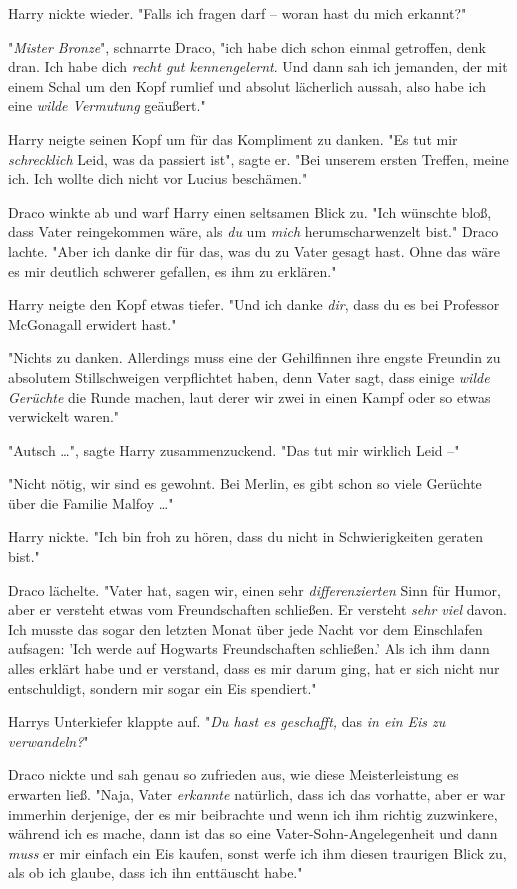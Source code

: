 {Harry nickte wieder. "Falls ich fragen darf -- woran hast du mich erkannt?"

"\emph{Mister Bronze}", schnarrte Draco, "ich habe dich schon einmal getroffen, denk dran. Ich habe dich \emph{recht gut kennengelernt}. Und dann sah ich jemanden, der mit einem Schal um den Kopf rumlief und absolut lächerlich aussah, also habe ich eine \emph{wilde Vermutung} geäußert."

Harry neigte seinen Kopf um für das Kompliment zu danken. "Es tut mir \emph{schrecklich} Leid, was da passiert ist", sagte er. "Bei unserem ersten Treffen, meine ich. Ich wollte dich nicht vor Lucius beschämen."

Draco winkte ab und warf Harry einen seltsamen Blick zu. "Ich wünschte bloß, dass Vater reingekommen wäre, als \emph{du} um \emph{mich} herumscharwenzelt bist." Draco lachte. "Aber ich danke dir für das, was du zu Vater gesagt hast. Ohne das wäre es mir deutlich schwerer gefallen, es ihm zu erklären."

Harry neigte den Kopf etwas tiefer. "Und ich danke \emph{dir}, dass du es bei Professor McGonagall erwidert hast."

"Nichts zu danken. Allerdings muss eine der Gehilfinnen ihre engste Freundin zu absolutem Stillschweigen verpflichtet haben, denn Vater sagt, dass einige \emph{wilde Gerüchte} die Runde machen, laut derer wir zwei in einen Kampf oder so etwas verwickelt waren."

"Autsch …", sagte Harry zusammenzuckend. "Das tut mir wirklich Leid --"

"Nicht nötig, wir sind es gewohnt. Bei Merlin, es gibt schon so viele Gerüchte über die Familie Malfoy …"

Harry nickte. "Ich bin froh zu hören, dass du nicht in Schwierigkeiten geraten bist."

Draco lächelte. "Vater hat, sagen wir, einen sehr \emph{differenzierten} Sinn für Humor, aber er versteht etwas vom Freundschaften schließen. Er versteht \emph{sehr viel} davon. Ich musste das sogar den letzten Monat über jede Nacht vor dem Einschlafen aufsagen: 'Ich werde auf Hogwarts Freundschaften schließen.' Als ich ihm dann alles erklärt habe und er verstand, dass es mir darum ging, hat er sich nicht nur entschuldigt, sondern mir sogar ein Eis spendiert."

Harrys Unterkiefer klappte auf. "\emph{Du hast es geschafft,} das \emph{in ein Eis zu verwandeln?}"

Draco nickte und sah genau so zufrieden aus, wie diese Meisterleistung es erwarten ließ. "Naja, Vater \emph{erkannte} natürlich, dass ich das vorhatte, aber er war immerhin derjenige, der es mir beibrachte und wenn ich ihm richtig zuzwinkere, während ich es mache, dann ist das so eine Vater-Sohn-Angelegenheit und dann \emph{muss} er mir einfach ein Eis kaufen, sonst werfe ich ihm diesen traurigen Blick zu, als ob ich glaube, dass ich ihn enttäuscht habe."

}

